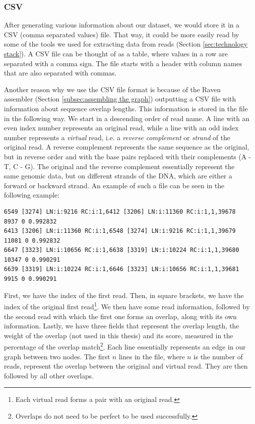 \documentclass[times, utf8, diplomski, english]{fer_eng}
\begin{document}
\subsubsection{CSV}
\label{subsubsec:csv}

After generating various information about our dataset, we would store it in a CSV (comma separated values) file. That way, it could be  more easily read by some of the tools we used for extracting data from reads (Section \ref{sec:technology stack}). A CSV file can be thought of as a table, where values in a row are separated with a comma sign. The file starts with a header with column names that are also separated with commas.

Another reason why we use the CSV file format is because of the Raven assembler (Section \ref{subsec:assembling the graph}) outputting a CSV file with information about sequence overlap lengths. This information is stored in the file in the following way. We start in a descending order of read name. A line with an even index number represents an original read, while a line with an odd index number represents a \textit{virtual} read, i.e. a \textit{reverse complement} or \textit{strand} of the original read. A reverse complement represents the same sequence as the original, but in reverse order and with the base pairs replaced with their complements (A - T, C - G). The original and the reverse complement essentially represent the same genomic data, but on different strands of the DNA, which are either a forward or backward strand. An example of such a file can be seen in the following example:
\begin{lstlisting}
6549 [3274] LN:i:9216 RC:i:1,6412 [3206] LN:i:11360 RC:i:1,1,39678 8937 0 0.992832
6413 [3206] LN:i:11360 RC:i:1,6548 [3274] LN:i:9216 RC:i:1,1,39679 11081 0 0.992832
6647 [3323] LN:i:10656 RC:i:1,6638 [3319] LN:i:10224 RC:i:1,1,39680 10347 0 0.990291
6639 [3319] LN:i:10224 RC:i:1,6646 [3323] LN:i:10656 RC:i:1,1,39681 9915 0 0.990291
\end{lstlisting}
First, we have the index of the first read. Then, in square brackets, we have the index of the original first read\footnote{Each virtual read forms a pair with an original read.}. We then have some read information, followed by the second read with which the first one forms an overlap, along with its own information. Lastly, we have three fields that represent the overlap length, the weight of the overlap (not used in this thesis) and its score, measured in the percentage of the overlap match\footnote{Overlaps do not need to be perfect to be used successfully.}. Each line essentially represents an edge in our graph between two nodes. The first $n$ lines in the file, where $n$ is the number of reads, represent the overlap between the original and virtual read. They are then followed by all other overlaps.
\end{document}
